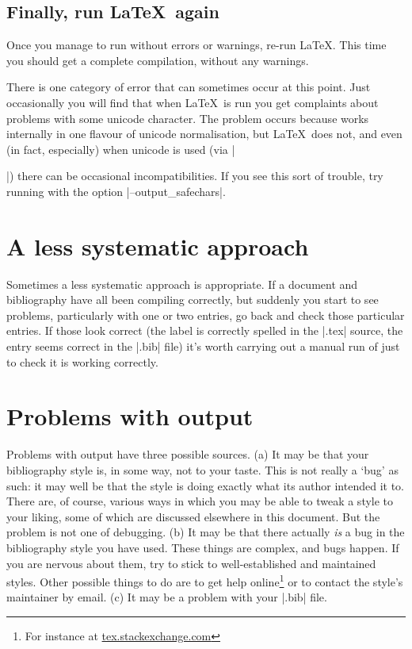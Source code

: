 \subsection{Finally, run \LaTeX\ again}

Once you manage to run  without errors or warnings,
re-run \LaTeX. This time you should get a complete compilation,
without any warnings.

There is one category of error that can sometimes occur at this
point. Just occasionally you will find that when \LaTeX\ is run you
get complaints about problems with some unicode character. The problem
occurs because  works internally in one flavour of
unicode normalisation, but \LaTeX\ does not, and even (in fact,
especially) when unicode is used (via |\usepackage[utf8]{inputenc}|)
there can be occasional incompatibilities. If you see this sort of
trouble, try running  with the option
|--output_safechars|.

\section{A less systematic approach}

Sometimes a less systematic approach is appropriate. If a document and
bibliography have all been compiling correctly, but suddenly you start
to see problems, particularly with one or two entries, go back and
check those particular entries. If those look correct (the label is
correctly spelled in the |.tex| source, the entry seems correct in the
|.bib| file) it's worth carrying out a manual run of 
just to check it is working correctly.

\section{Problems with output}

Problems with output have three possible sources. (a) It may be that
your bibliography style is, in some way, not to your taste. This is
not really a `bug' as such: it may well be that the style is doing
exactly what its author intended it to. There are, of course, various
ways in which you may be able to tweak a style to your liking, some of
which are discussed elsewhere in this document. But the problem is not
one of debugging. (b) It may be that there actually \emph{is} a bug in
the bibliography style you have used. These things are complex, and
bugs happen. If you are nervous about them, try to stick to
well-established and maintained styles. Other possible things to do
are to get help online\footnote{For instance at
  \url{tex.stackexchange.com}} or to contact the style's maintainer by
email. (c) It may be a problem with your |.bib| file.

